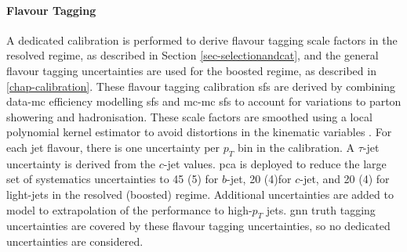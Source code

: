 \paragraph{Flavour Tagging} A dedicated calibration is performed to derive flavour tagging scale factors in the resolved regime, as described in Section \ref{sec-selectionandcat}, and the general flavour tagging uncertainties are used for the boosted regime, as described in \ref{chap-calibration}. These flavour tagging calibration \glspl{sf} are derived by combining data-\gls{mc} efficiency modelling \glspl{sf} and \gls{mc}-\gls{mc} \glspl{sf} to account for variations to parton showering and hadronisation. These scale factors are smoothed using a local polynomial kernel estimator to avoid distortions in the kinematic variables \cite{ATL-PHYS-PUB-2020-004}. For each jet flavour, there is one uncertainty per $p_T$ bin in the calibration. A $\tau$-jet uncertainty is derived from the $c$-jet values. \gls{pca} is deployed to reduce the large set of systematics uncertainties to 45 (5) for $b$-jet, 20 (4)for $c$-jet, and 20 (4) for light-jets in the resolved (boosted) regime. Additional uncertainties are added to model to extrapolation of the performance to high-$p_T$ jets. \gls{gnn} truth tagging uncertainties are covered by these flavour tagging uncertainties, so no dedicated uncertainties are considered.

